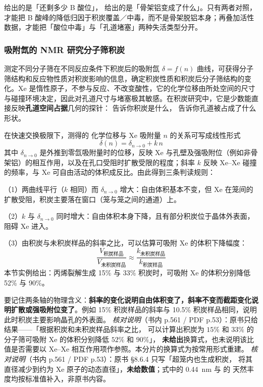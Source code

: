 \begin{crosscheck}
 给出的是「还剩多少 B 酸位」， 给出的是「骨架铝变成了什么」。只有两者对照，才能把 B 酸峰的降低归因于积炭覆盖／中毒，而不是骨架脱铝本身；再叠加活性数据，才能把「酸位中毒」与「孔道堵塞」两种失活类型分开。
\end{crosscheck}

\subsubsection{吸附氙的  NMR 研究分子筛积炭}

测定不同分子筛在不同反应条件下积炭后的吸附氙 $\delta=f(n)$ 曲线，可获得分子筛结构和反应物性质对积炭影响的信息，确定积炭性质和积炭后分子筛结构的变化。Xe 是惰性原子，不参与反应、不改变酸性，它的化学位移由所处空间的尺寸与碰撞环境决定，因此对孔道尺寸与堵塞极其敏感。在积炭研究中，它是少数能直接反映\textbf{孔道空间占据}几何的探针： 告诉你积炭是什么， 告诉你孔道被占成了什么形状。

\begin{principle}
在快速交换极限下，测得的  化学位移与 Xe 吸附量 $n$ 的关系可写成线性形式
\[
\delta(n)=\delta_{n\to 0}+k\,n
\]
其中 $\delta_{n\to 0}$ 是外推到零氙吸附量时的位移，反映 Xe 与孔壁及强吸附位（例如非骨架铝）的相互作用，以及在孔口受阻时扩散受限的程度；斜率 $k$ 反映 Xe--Xe 碰撞的频率，与 Xe 可自由活动的体积成反比。由此得到三条判读规则：

（1）两曲线平行（$k$ 相同）而 $\delta_{n\to 0}$ 增大：自由体积基本不变，但 Xe 在笼间的扩散受阻，积炭主要落在窗口（笼与笼之间的通道）上。

（2）$k$ 与 $\delta_{n\to 0}$ 同时增大：自由体积本身下降，且有部分积炭位于晶体外表面，阻碍 Xe 进入。

（3）由积炭与未积炭样品的斜率之比，可以估算可吸附 Xe 的体积下降幅度：
\[
\frac{V_{\text{积炭样品}}}{V_{\text{未积炭样品}}}\approx\frac{k_{\text{未积炭样品}}}{k_{\text{积炭样品}}}
\]
本节实例给出：丙烯裂解生成 15\% 与 33\% 积炭时，可吸附 Xe 的体积分别降低 52\% 与 90\%。

要记住两条轴的物理含义：\textbf{斜率的变化说明自由体积变了，斜率不变而截距变化说明扩散或强吸附位变了}。例如 15\% 积炭样品的斜率与 10.5\% 积炭样品相同，说明此时积炭主要影响晶孔的外表面。
\emph{核对说明}（书内 p.561 / PDF p.53）：原书只给结果——「根据积炭和未积炭样品斜率之比，
可以计算出积炭为 $15\%$ 和 $33\%$ 的分子筛可吸附 Xe 的体积分别降低 $52\%$ 和 $90\%$」，
\textbf{未给出}换算式，也未说明该比值是否需要以 Xe--Xe 相互作用项作参照。本分片的换算式为按常用形式重建。
\emph{核对说明}（书内 p.561 / PDF p.53）：原书 §8.6.4 只写「超笼内也生成积炭，
将其直径减少到约为 Xe 原子的动态直径」，\textbf{未给数值}；式中的 \qty{0.44}{nm} 与  的
天然丰度均按标准值补入，非原书内容。
\end{principle}

